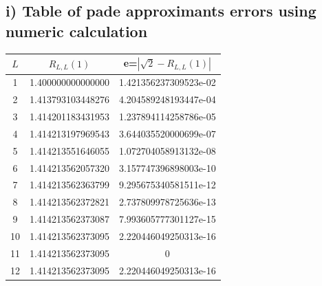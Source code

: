 \documentclass[10pt]{article}
\begin{document}
\subsection*{i) Table of pade approximants errors using numeric calculation}
    \begin{tabular}{c|c|c}
    $L$ & $R_{L,L}(1)$ & e=$|\sqrt{2}-R_{L,L}(1)|$\\
    \hline
     1    & 1.400000000000000    &  1.421356237309523e-02\\
     2    & 1.413793103448276    & 4.204589248193447e-04\\
     3    & 1.414201183431953    & 1.237894114258786e-05\\
     4    & 1.414213197969543    & 3.644035520000699e-07\\
     5    & 1.414213551646055    & 1.072704058913132e-08\\
     6    & 1.414213562057320    & 3.157747396898003e-10\\
     7    & 1.414213562363799    & 9.295675340581511e-12\\
     8    & 1.414213562372821    & 2.737809978725636e-13\\
     9    & 1.414213562373087    & 7.993605777301127e-15\\
     10   & 1.414213562373095    & 2.220446049250313e-16\\
     11   & 1.414213562373095    &                     0\\
     12   & 1.414213562373095    & 2.220446049250313e-16
    \end{tabular}
\end{document}
